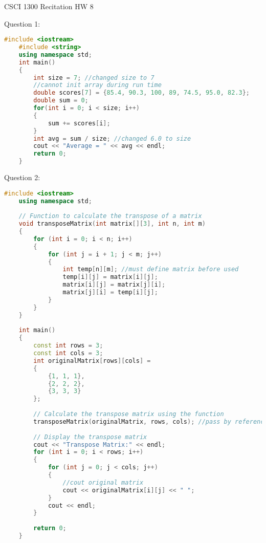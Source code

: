 \documentclass{article}
\begin{document}
CSCI 1300 Recitation HW 8

\vspace{1cm}

Question 1:

\begin{lstlisting}[language=C++]
    #include <iostream>
    #include <string> 
    using namespace std;
    int main()
    {
        int size = 7; //changed size to 7
        //cannot init array during run time
        double scores[7] = {85.4, 90.3, 100, 89, 74.5, 95.0, 82.3};
        double sum = 0;
        for(int i = 0; i < size; i++)
        {
            sum += scores[i];
        }
        int avg = sum / size; //changed 6.0 to size
        cout << "Average = " << avg << endl;
        return 0; 
    }
\end{lstlisting}

\vspace{1cm}

Question 2:

\begin{lstlisting}[language=C++]
    #include <iostream>
    using namespace std;
    
    // Function to calculate the transpose of a matrix
    void transposeMatrix(int matrix[][3], int n, int m) 
    { 
        for (int i = 0; i < n; i++)
        {
            for (int j = i + 1; j < m; j++)
            {
                int temp[n][m]; //must define matrix before used
                temp[i][j] = matrix[i][j];
                matrix[i][j] = matrix[j][i];
                matrix[j][i] = temp[i][j];
            }
        }
    } 
    
    int main() 
    {
        const int rows = 3;
        const int cols = 3;
        int originalMatrix[rows][cols] = 
        {
            {1, 1, 1},
            {2, 2, 2},
            {3, 3, 3}
        };
    
        // Calculate the transpose matrix using the function
        transposeMatrix(originalMatrix, rows, cols); //pass by reference
    
        // Display the transpose matrix
        cout << "Transpose Matrix:" << endl;
        for (int i = 0; i < rows; i++) 
        {
            for (int j = 0; j < cols; j++) 
            {
                //cout original matrix
                cout << originalMatrix[i][j] << " "; 
            }
            cout << endl;
        }
    
        return 0;
    }
\end{lstlisting}
\end{document}
